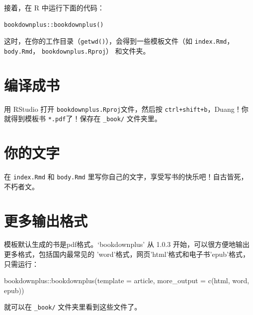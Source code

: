 \documentclass[doublesided]{Style/ucasthesis}%
\newenvironment{Shaded}{\begin{snugshade}}{\end{snugshade}}
\newcommand{\SpecialCharTok}[1]{\textcolor[rgb]{0.00,0.00,0.00}{{#1}}}
\newcommand{\StringTok}[1]{\textcolor[rgb]{0.31,0.60,0.02}{{#1}}}
\newcommand{\FunctionTok}[1]{\textcolor[rgb]{0.00,0.00,0.00}{{#1}}}
\newcommand{\AttributeTok}[1]{\textcolor[rgb]{0.77,0.63,0.00}{{#1}}}
\newcommand{\NormalTok}[1]{{#1}}
\begin{document}
接着，在 R 中运行下面的代码：

\begin{verbatim}
bookdownplus::bookdownplus()
\end{verbatim}

这时，在你的工作目录（\texttt{getwd()}），会得到一些模板文件（如 \texttt{index.Rmd}，\texttt{body.Rmd}， \texttt{bookdownplus.Rproj}） 和文件夹。

\hypertarget{ux7f16ux8bd1ux6210ux4e66}{%
\section{编译成书}\label{ux7f16ux8bd1ux6210ux4e66}}

用 RStudio 打开 \texttt{bookdownplus.Rproj}文件，然后按 \texttt{ctrl+shift+b}，Duang！你就得到模板书 \texttt{*.pdf}了！保存在 \texttt{\_book/} 文件夹里。

\hypertarget{ux4f60ux7684ux6587ux5b57}{%
\section{你的文字}\label{ux4f60ux7684ux6587ux5b57}}

在 \texttt{index.Rmd} 和 \texttt{body.Rmd} 里写你自己的文字，享受写书的快乐吧！自古皆死，不朽者文。

\hypertarget{ux66f4ux591aux8f93ux51faux683cux5f0f}{%
\section{更多输出格式}\label{ux66f4ux591aux8f93ux51faux683cux5f0f}}

模板默认生成的书是pdf格式。`bookdownplus' 从 1.0.3 开始，可以很方便地输出更多格式，包括国内最常见的 'word'格式，网页'html'格式和电子书'epub'格式，只需运行：

\begin{Shaded}
\begin{Highlighting}[]
\NormalTok{bookdownplus}\SpecialCharTok{::}\FunctionTok{bookdownplus}\NormalTok{(}\AttributeTok{template =} \StringTok{\textquotesingle{}article\textquotesingle{}}\NormalTok{, }
    \AttributeTok{more\_output =} \FunctionTok{c}\NormalTok{(}\StringTok{\textquotesingle{}html\textquotesingle{}}\NormalTok{, }\StringTok{\textquotesingle{}word\textquotesingle{}}\NormalTok{, }\StringTok{\textquotesingle{}epub\textquotesingle{}}\NormalTok{))}
\end{Highlighting}
\end{Shaded}

就可以在 \texttt{\_book/} 文件夹里看到这些文件了。
\end{document}
